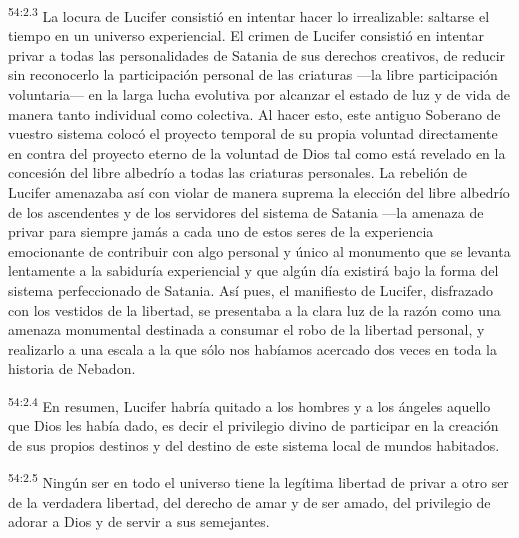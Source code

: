 \par
\textsuperscript{54:2.3} La locura de Lucifer consistió en intentar hacer lo irrealizable: saltarse el tiempo en un universo experiencial. El crimen de Lucifer consistió en intentar privar a todas las personalidades de Satania de sus derechos creativos, de reducir sin reconocerlo la participación personal de las criaturas ---la libre participación voluntaria--- en la larga lucha evolutiva por alcanzar el estado de luz y de vida de manera tanto individual como colectiva. Al hacer esto, este antiguo Soberano de vuestro sistema colocó el proyecto temporal de su propia voluntad directamente en contra del proyecto eterno de la voluntad de Dios tal como está revelado en la concesión del libre albedrío a todas las criaturas personales. La rebelión de Lucifer amenazaba así con violar de manera suprema la elección del libre albedrío de los ascendentes y de los servidores del sistema de Satania ---la amenaza de privar para siempre jamás a cada uno de estos seres de la experiencia emocionante de contribuir con algo personal y único al monumento que se levanta lentamente a la sabiduría experiencial y que algún día existirá bajo la forma del sistema perfeccionado de Satania. Así pues, el manifiesto de Lucifer, disfrazado con los vestidos de la libertad, se presentaba a la clara luz de la razón como una amenaza monumental destinada a consumar el robo de la libertad personal, y realizarlo a una escala a la que sólo nos habíamos acercado dos veces en toda la historia de Nebadon.

\par
\textsuperscript{54:2.4} En resumen, Lucifer habría quitado a los hombres y a los ángeles aquello que Dios les había dado, es decir el privilegio divino de participar en la creación de sus propios destinos y del destino de este sistema local de mundos habitados.

\par
\textsuperscript{54:2.5} Ningún ser en todo el universo tiene la legítima libertad de privar a otro ser de la verdadera libertad, del derecho de amar y de ser amado, del privilegio de adorar a Dios y de servir a sus semejantes.

